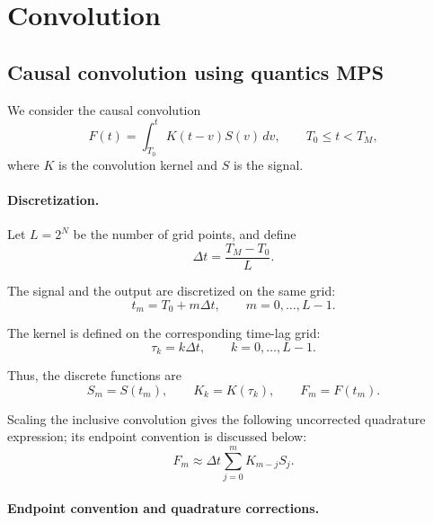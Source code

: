 \documentclass{article}
\begin{document}
\section{Convolution}

\subsection{Causal convolution using quantics MPS}

We consider the causal convolution
\begin{equation}
    F(t)=\int_{T_0}^{t} K(t-v)S(v)\,dv,
    \qquad T_0\leq t<T_M,
\end{equation}
where $K$ is the convolution kernel and $S$ is the signal.

\paragraph{Discretization.}

Let $L=2^N$ be the number of grid points, and define
\begin{equation}
    \Delta t=\frac{T_M-T_0}{L}.
\end{equation}

The signal and the output are discretized on the same grid:
\begin{equation}
    t_m=T_0+m\Delta t,
    \qquad m=0,\ldots,L-1.
\end{equation}

The kernel is defined on the corresponding time-lag grid:
\begin{equation}
    \tau_k=k\Delta t,
    \qquad k=0,\ldots,L-1.
\end{equation}

Thus, the discrete functions are
\begin{equation}
    S_m=S(t_m),\qquad
    K_k=K(\tau_k),\qquad
    F_m=F(t_m).
\end{equation}

Scaling the inclusive convolution gives the following uncorrected quadrature
expression; its endpoint convention is discussed below:
\begin{equation}
    \boxed{
    F_m \approx \Delta t
    \sum_{j=0}^{m}K_{m-j}S_j.
    }
    \label{eq:causal_convolution}
\end{equation}

\paragraph{Endpoint convention and quadrature corrections.}
\end{document}
